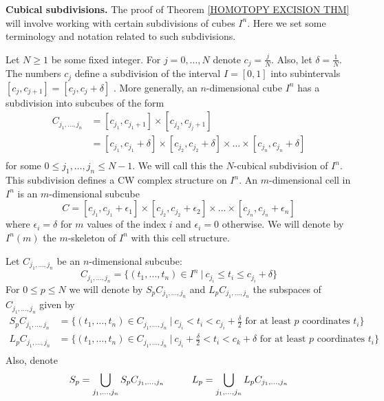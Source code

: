 \begin{nn}{\bf Cubical subdivisions.}
The proof of Theorem \ref{HOMOTOPY  EXCISION THM} will involve working with 
certain subdivisions of cubes $I^{n}$. Here we set some terminology and notation 
related to such subdivisions. 

Let $N \geq 1$ be some fixed integer. For $j=0,\dots, N$
denote $c_{j} = \frac{j}{N}$. Also, let $\delta = \frac{1}{N}$. The numbers 
$c_{j}$ define a subdivision of the interval $I = [0, 1]$ into subintervals
$[c_{j}, c_{j+1}] = [c_{j}, c_{j} + \delta]$ . 
More generally, an $n$-dimensional cube $I^{n}$ has a subdivision 
into subcubes of the form 
\begin{align*}
C_{j_{1}, \dots, j_{n}} & = 
[c_{j_{1}}, c_{j_{1}+1}]\times [c_{j_{2}}, c_{j_{j}+1}] \\
& = [c_{j_{1}}, c_{j_{1}} + \delta]\times [c_{j_{2}}, c_{j_{2}}+ \delta]
\times {\dots}\times [c_{j_{n}}, c_{j_{n}}+ \delta]\\
\end{align*}
for some $0 \leq j_{1}, \dots, j_{n} \leq N-1$. We will call this
the $N$-cubical subdivision of $I^{n}$. This subdivision defines a CW complex 
structure on $I^{n}$. An $m$-dimensional cell in $I^{n}$ is an $m$-dimensional subcube 
\[
C = [c_{j_{1}}, c_{j_{1}} + \epsilon_{1}]\times [c_{j_{2}}, c_{j_{2}}  + \epsilon_{2}] 
\times {\dots} \times [c_{j_{n}}, c_{j_{n}}  + \epsilon_{n}]
\] 
where $\epsilon_{i} = \delta$ for $m$ values of the index $i$ and $\epsilon_{i} = 0$ 
otherwise. We will denote by $I^{n}(m)$ the $m$-skeleton of $I^{n}$ with this cell structure.

Let $C_{j_{1}, \dots, j_{n}}$ be an $n$-dimensional subcube: 
\[
C_{j_{1}, \dots, j_{n}}
= \{ (t_{1}, \dots, t_{n})\in I^{n} 
\ | \  c_{j_{i}} \leq t_{i} \leq c_{j_{i}} + \delta  \}
\]
For $0\leq p \leq N$ we will denote by $S_{p}C_{j_{1}, \dots, j_{n}}$ 
and $L_{p}C_{j_{1}, \dots, j_{n}}$
the subspaces of $C_{j_{1}, \dots, j_{n}}$ given by 
\begin{align*}
S_{p}C_{j_{1}, \dots, j_{n}} & 
= \{ (t_{1}, \dots, t_{n})\in C_{j_{1}, \dots, j_{n}} 
\ | \  c_{j_{i}} < t_{i} < c_{j_{i}} + \textstyle{\frac{\delta}{2}}  
\text{ for at  least $p$ coordinates $t_{i}$}\} \\
L_{p}C_{j_{1}, \dots, j_{n}} & 
= \{ (t_{1}, \dots, t_{n})\in C_{j_{1}, \dots, j_{n}}  
\ | \  c_{j_{i}} + \textstyle{\frac{\delta}{2}} < t_{i} < c_{k} + \delta
\text{ for at  least $p$ coordinates $t_{i}$}\} \\
\end{align*}
Also, denote
\[
S_{p}  = \bigcup_{j_{1}, \dots, j_{n}} S_{p}C_{j_{1}, \dots, j_{n}} \hskip 10mm
L_{p}  = \bigcup_{j_{1}, \dots, j_{n}} L_{p}C_{j_{1}, \dots, j_{n}}
\]
\end{nn}



